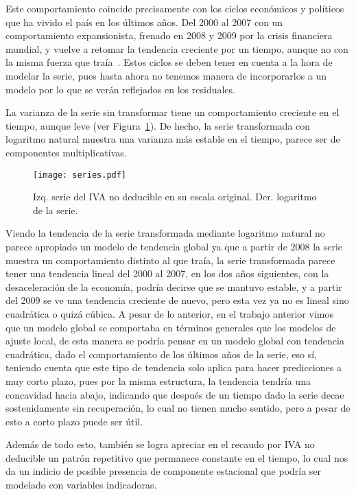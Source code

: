 \documentclass[11pt, letterpaper, twoside]{article}
\begin{document}
Este comportamiento coincide precisamente con los ciclos económicos y políticos que ha vivido el país en los últimos años. Del 2000 al 2007 con un comportamiento expansionista, frenado en 2008 y 2009 por la crisis financiera mundial, y vuelve a retomar la tendencia creciente por un tiempo, aunque no con la misma fuerza que traía~\cite{just-tribut}. Estos ciclos se deben tener en cuenta a la hora de modelar la serie, pues hasta ahora no tenemos manera de incorporarlos a un modelo por lo que se verán reflejados en los residuales.

La varianza de la serie sin transformar tiene un comportamiento creciente en el tiempo, aunque leve (ver Figura~\ref{fig:series}). De hecho, la serie transformada con logaritmo natural muestra una varianza más estable en el tiempo, parece ser de componentes multiplicativas.


\begin{figure}[ht!]
    \centering
    \texttt{[image: series.pdf]}
    \caption{Izq. serie del IVA no deducible en su escala original. Der. logaritmo de la serie.}
    \label{fig:series}
\end{figure}


Viendo la tendencia de la serie transformada mediante logaritmo natural no parece apropiado un modelo de tendencia global ya que a partir de 2008 la serie muestra un comportamiento distinto al que traía, la serie transformada parece tener una tendencia lineal del 2000 al 2007, en los dos años siguientes, con la desaceleración de la economía, podría decirse que se mantuvo estable, y a partir del 2009 se ve una tendencia creciente de nuevo, pero esta vez ya no es lineal sino cuadrática o quizá cúbica. A pesar de lo anterior, en el trabajo anterior vimos que un modelo global se comportaba en términos  generales que los modelos de ajuste local, de esta manera se podría pensar en un modelo global con tendencia cuadrática, dado el comportamiento de los últimos años de la serie, eso sí, teniendo cuenta que este tipo de tendencia solo aplica para hacer predicciones a muy corto plazo, pues por la misma estructura, la tendencia tendría una concavidad hacia abajo, indicando que después de un tiempo dado la serie decae sostenidamente sin recuperación, lo cual no tienen mucho sentido, pero a pesar de esto a corto plazo puede ser útil.

Además de todo esto, también se logra apreciar en el recaudo por IVA no deducible un patrón repetitivo que permanece constante en el tiempo, lo cual nos da un indicio de posible presencia de componente estacional que podría ser modelado con variables indicadoras.
\end{document}
